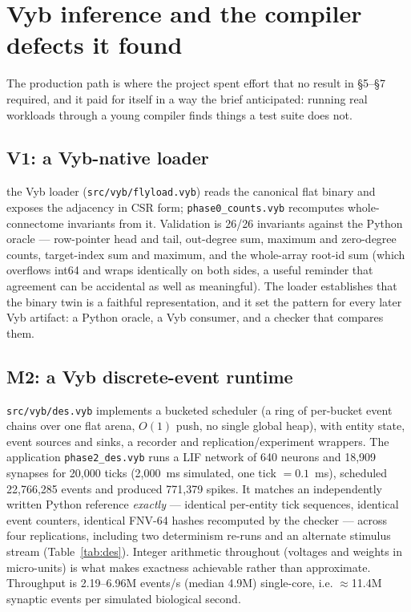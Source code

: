 \documentclass[11pt,a4paper]{article}
\newcommand{\code}[1]{\texttt{\footnotesize #1}}
\begin{document}
\section{Vyb inference and the compiler defects it found}
\label{sec:vyb}

The production path is where the project spent effort that no result in \S5--\S7 required, and it
paid for itself in a way the brief anticipated: running real workloads through a young compiler
finds things a test suite does not.

\subsection{V1: a Vyb-native loader}
the Vyb loader (\code{src/vyb/flyload.vyb}) reads the canonical flat binary and exposes the adjacency in CSR form;
\code{phase0\_counts.vyb} recomputes whole-connectome invariants from it. Validation is 26/26
invariants against the Python oracle --- row-pointer head and tail, out-degree sum, maximum and
zero-degree counts, target-index sum and maximum, and the whole-array root-id sum (which
overflows int64 and wraps identically on both sides, a useful reminder that agreement can be
accidental as well as meaningful). The loader establishes that the binary twin is a faithful
representation, and it set the pattern for every later Vyb artifact: a Python oracle, a Vyb
consumer, and a checker that compares them.

\subsection{M2: a Vyb discrete-event runtime}
\code{src/vyb/des.vyb} implements a bucketed scheduler (a ring of per-bucket event chains over one
flat arena, $O(1)$ push, no single global heap), with entity state, event sources and sinks, a
recorder and replication/experiment wrappers. The application \code{phase2\_des.vyb} runs a LIF
network of 640 neurons and 18{,}909 synapses for 20{,}000 ticks (2{,}000~ms simulated, one tick
$=0.1$~ms), scheduled 22{,}766{,}285 events and produced 771{,}379 spikes. It matches an
independently written Python reference \emph{exactly} --- identical per-entity tick sequences,
identical event counters, identical FNV-64 hashes recomputed by the checker --- across four
replications, including two determinism re-runs and an alternate stimulus stream
(Table~\ref{tab:des}). Integer arithmetic throughout (voltages and weights in micro-units) is what
makes exactness achievable rather than approximate. Throughput is 2.19--6.96M events/s
(median 4.9M) single-core, i.e. $\approx$11.4M synaptic events per simulated biological second.
\end{document}

